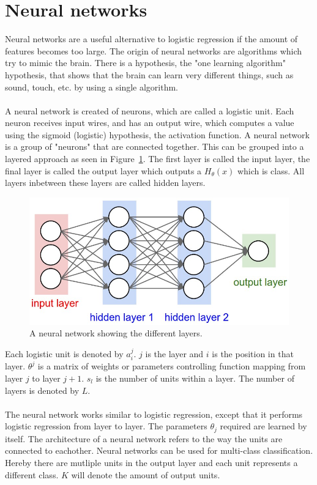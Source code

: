 \section{Neural networks}
Neural networks are a useful alternative to logistic regression if the amount of features becomes too large. The origin of neural networks are algorithms which try to mimic the brain. There is a hypothesis, the "one learning algorithm" hypothesis, that shows that the brain can learn very different things, such as sound, touch, etc. by using a single algorithm. \\\\
A neural network is created of neurons, which are called a logistic unit. Each neuron receives input wires, and has an output wire, which computes a value using the sigmoid (logistic) hypothesis, the activation function. A neural network is a group of "neurons" that are connected together. This can be grouped into a layered approach as seen in Figure~\ref{fig:neuralnetwork}. The first layer is called the input layer, the final layer is called the output layer which outputs a $H_\theta(x)$ which is class. All layers inbetween these layers are called hidden layers.
\begin{figure}[H]
\centering
\includegraphics[width=1\textwidth]{Figures/neuralnet}
\decoRule
\caption[Neural network]{A neural network showing the different layers.\cite{neuralnetwork}}
\label{fig:neuralnetwork}
\end{figure}
\noindent Each logistic unit is denoted by $a_i^j$. $j$ is the layer and $i$ is the position in that layer. $\theta^j$ is a matrix of weights or parameters controlling function mapping from layer $j$ to layer $j+1$. $s_l$ is the number of units within a layer. The number of layers is denoted by $L$.\\\\The neural network works similar to logistic regression, except that it performs logistic regression from layer to layer. The parameters $\theta_j$ required are learned by itself. The architecture of a neural network refers to the way the units are connected to eachother. Neural networks can be used for multi-class classification. Hereby there are mutliple units in the output layer and each unit represents a different class. $K$ will denote the amount of output units.
